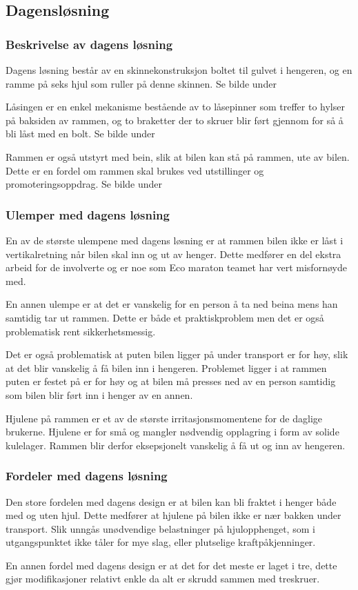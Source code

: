 \subsection{Dagensløsning}
\subsubsection{Beskrivelse av dagens løsning}

Dagens løsning består av en skinnekonstruksjon boltet til gulvet i hengeren, og en ramme på seks hjul som ruller på denne skinnen. Se bilde under

Låsingen er en enkel mekanisme bestående av to låsepinner som treffer to hylser på baksiden av rammen, og to braketter der to skruer blir ført gjennom for så å bli låst med en bolt. Se bilde under

Rammen er også utstyrt med bein, slik at bilen kan stå på rammen, ute av bilen. Dette er en fordel om rammen skal brukes ved utstillinger og promoteringsoppdrag.  Se bilde under
\subsubsection{Ulemper med dagens løsning}

En av de største ulempene med dagens løsning er at rammen bilen ikke er låst i vertikalretning når bilen skal inn og ut av henger. Dette medfører en del ekstra arbeid for de involverte og er noe som Eco maraton teamet har vert misfornøyde med.

En annen ulempe er at det er vanskelig for en person å ta ned beina mens han samtidig tar ut rammen. Dette er både et praktiskproblem men det er også problematisk rent sikkerhetsmessig. 

Det er også problematisk at puten bilen ligger på under transport er for høy, slik at det blir vanskelig å få bilen inn i hengeren. Problemet ligger i at rammen puten er festet på er for høy og at bilen må presses ned av en person samtidig som bilen blir ført inn i henger av en annen.

Hjulene på rammen er et av de største irritasjonsmomentene for de daglige brukerne. Hjulene er for små og mangler nødvendig opplagring i form av solide kulelager. Rammen blir derfor eksepsjonelt vanskelig å få ut og inn av hengeren. 

\subsubsection{Fordeler med dagens løsning}

Den store fordelen med dagens design er at bilen kan bli fraktet i henger både med og uten hjul. Dette medfører at hjulene på bilen ikke er nær bakken under transport. Slik unngås unødvendige belastninger på hjulopphenget, som i utgangspunktet ikke tåler for mye slag, eller plutselige kraftpåkjenninger. 

En annen fordel med dagens design er at det for det meste er laget i tre, dette gjør modifikasjoner relativt enkle da alt er skrudd sammen med treskruer.


